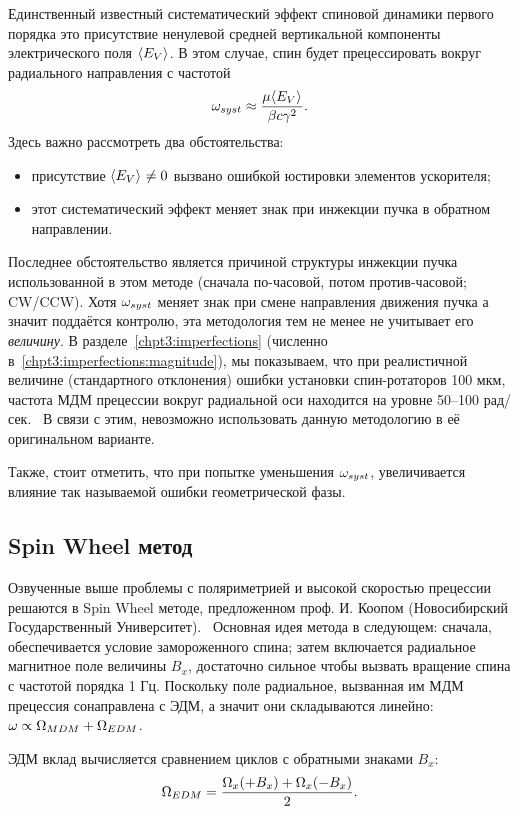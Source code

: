Единственный известный систематический эффект спиновой динамики
первого порядка это присутствие ненулевой средней вертикальной
компоненты электрического поля $\avg{E_V}$. В этом случае, спин будет
прецессировать вокруг радиального направления с частотой~\cite[стр.~11]{BNL:Deuteron2008}
\[
\w_{syst} \approx \frac{\mu\avg{E_V}}{\beta c\gamma^2}.
\]
Здесь важно рассмотреть два обстоятельства:
\begin{itemize}
\item присутствие $\avg{E_V}\neq 0$ вызвано ошибкой юстировки
  элементов ускорителя;
\item этот систематический эффект меняет знак при инжекции пучка в
  обратном направлении.
\end{itemize}
Последнее обстоятельство является причиной структуры инжекции пучка
использованной в этом методе (сначала по-часовой, потом
против-часовой; CW/CCW). Хотя $\omega_{syst}$ меняет знак при смене
направления движения пучка а значит поддаётся контролю, эта методология тем не менее не учитывает
его \emph{величину}. В разделе~\ref{chpt3:imperfections} (численно в~\ref{chpt3:imperfections:magnitude}), 
мы показываем, что при реалистичной величине (стандартного отклонения) ошибки установки
спин-ротаторов 100 мкм, частота МДМ прецессии вокруг радиальной оси
находится на уровне 50--100 рад/сек.~\cite{Senichev:FDM} В связи с
этим, невозможно использовать данную методологию в её оригинальном варианте.

Также, стоит отметить, что при попытке уменьшения $\omega_{syst}$, увеличивается влияние
так называемой ошибки геометрической фазы.~\cite[стр.~6]{BNL:Proton}

\subsection{Spin Wheel метод}
Озвученные выше проблемы с поляриметрией и высокой скоростью прецессии
решаются в Spin Wheel методе, предложенном проф. И. Коопом
(Новосибирский Государственный Университет).~\cite{Koop:IPAC13} Основная идея метода в
следующем: сначала, обеспечивается условие замороженного спина; затем
включается радиальное магнитное поле величины $B_x$, достаточно сильное чтобы
вызвать вращение спина с частотой порядка 1 Гц. Поскольку поле
радиальное, вызванная им МДМ прецессия сонаправлена с ЭДМ, а значит
они складываются линейно: $\omega \propto \Omega_{MDM} + \Omega_{EDM}$.

ЭДМ вклад вычисляется сравнением циклов с обратными знаками $B_x$:~\cite[стр.~1963]{Koop:IPAC13}
\[
\Omega_{EDM} = \frac{\Omega_x(+B_x) + \Omega_x(-B_x)}{2}.
\]

